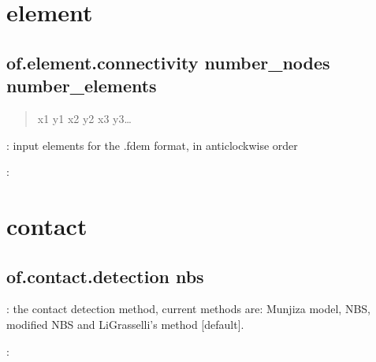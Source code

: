 \documentclass[letterpaper,10pt,english]{sphinxmanual}
\begin{document}
\chapter{element}
\label{\detokenize{rst_tutorials/command_line_guide:element}}

\section{of.element.connectivity number\_nodes number\_elements}
\label{\detokenize{rst_tutorials/command_line_guide:of-element-connectivity-number-nodes-number-elements}}\begin{quote}

x1 y1 x2 y2 x3 y3…
\end{quote}

: input elements for the .fdem format, in anticlockwise order

:

\begin{sphinxVerbatim}[commandchars=\\\{\}]
  

    

    

    
\end{sphinxVerbatim}


\chapter{contact}
\label{\detokenize{rst_tutorials/command_line_guide:contact}}

\section{of.contact.detection nbs}
\label{\detokenize{rst_tutorials/command_line_guide:of-contact-detection-nbs}}
: the contact detection method, current methods are: Munjiza model, NBS,
modified NBS and Li\sphinxhyphen{}Grasselli’s method {[}default{]}.

:

\begin{sphinxVerbatim}[commandchars=\\\{\}]
  
\end{sphinxVerbatim}
\end{document}
